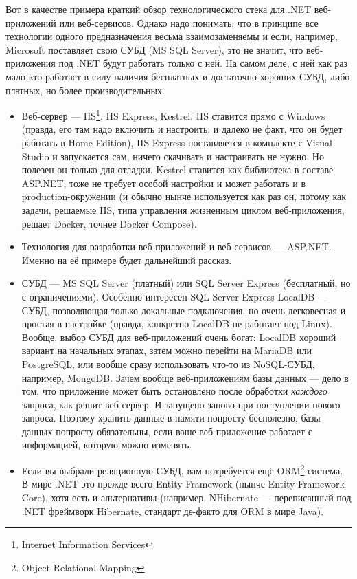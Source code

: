 \documentclass[a5paper]{article}
\begin{document}
Вот в качестве примера краткий обзор технологического стека для .NET веб-приложений или веб-сервисов. Однако надо понимать, что в принципе все технологии одного предназначения весьма взаимозаменяемы и если, например, Microsoft поставляет свою СУБД (MS SQL Server), это не значит, что веб-приложения под .NET будут работать только с ней. На самом деле, с ней как раз мало кто работает в силу наличия бесплатных и достаточно хороших СУБД, либо платных, но более производительных.

\begin{itemize}
    \item Веб-сервер --- IIS\footnote{Internet Information Services}, IIS Express, Kestrel. IIS ставится прямо с Windows (правда, его там надо включить и настроить, и далеко не факт, что он будет работать в Home Edition), IIS Express поставляется в комплекте с Visual Studio и запускается сам, ничего скачивать и настраивать не нужно. Но полезен он только для отладки. Kestrel ставится как библиотека в составе ASP.NET, тоже не требует особой настройки и может работать и в production-окружении (и обычно нынче используется как раз он, потому как задачи, решаемые IIS, типа управления жизненным циклом веб-приложения, решает Docker, точнее Docker Compose).
    \item Технология для разработки веб-приложений и веб-сервисов --- ASP.NET. Именно на её примере будет дальнейший рассказ.
    \item СУБД --- MS SQL Server (платный) или SQL Server Express (бесплатный, но с ограничениями). Особенно интересен SQL Server Express LocalDB --- СУБД, позволяющая только локальные подключения, но очень легковесная и простая в настройке (правда, конкретно LocalDB не работает под Linux). Вообще, выбор СУБД для веб-приложений очень богат: LocalDB хороший вариант на начальных этапах, затем можно перейти на MariaDB или PostgreSQL, или вообще сразу использовать что-то из NoSQL-СУБД, например, MongoDB. Зачем вообще веб-приложениям базы данных --- дело в том, что приложение может быть остановлено после обработки \emph{каждого} запроса, как решит веб-сервер. И запущено заново при поступлении нового запроса. Поэтому хранить данные в памяти попросту бесполезно, базы данных попросту обязательны, если ваше веб-приложение работает с информацией, которую можно изменять.
    \item Если вы выбрали реляционную СУБД, вам потребуется ещё ORM\footnote{Object-Relational Mapping}-система. В мире .NET это прежде всего Entity Framework (нынче Entity Framework Core), хотя есть и альтернативы (например, NHibernate --- переписанный под .NET фреймворк Hibernate, стандарт де-факто для ORM в мире Java).

\end{itemize}
\end{document}
